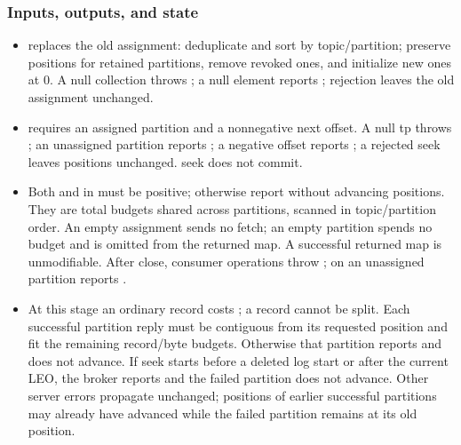 \subsubsection*{Inputs, outputs, and state}
\begin{itemize}
\item {} replaces the old assignment: deduplicate and sort by topic/partition; preserve positions for retained partitions, remove revoked ones, and initialize new ones at 0. A null collection throws ; a null element reports ; rejection leaves the old assignment unchanged.
\item {} requires an assigned partition and a nonnegative next offset. A null tp throws ; an unassigned partition reports ; a negative offset reports ; a rejected seek leaves positions unchanged. seek does not commit.
\item Both  and  in  must be positive; otherwise report  without advancing positions. They are total budgets shared across partitions, scanned in topic/partition order. An empty assignment sends no fetch; an empty partition spends no budget and is omitted from the returned map. A successful returned map is unmodifiable. After close, consumer operations throw ;  on an unassigned partition reports .
\item At this stage an ordinary record costs ; a record cannot be split. Each successful partition reply must be contiguous from its requested position and fit the remaining record/byte budgets. Otherwise that partition reports  and does not advance. If seek starts before a deleted log start or after the current LEO, the broker reports  and the failed partition does not advance. Other server errors propagate unchanged; positions of earlier successful partitions may already have advanced while the failed partition remains at its old position.
\end{itemize}
